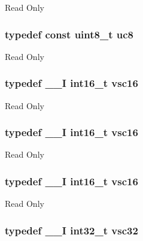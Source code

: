 Read Only \hypertarget{group___exported__types_gac74022c74a461f810e0d4fdc9bfea480}{
\subsubsection[{uc8}]{\setlength{\rightskip}{0pt plus 5cm}typedef const uint8\-\_\-t {\bf uc8}}}\label{group___exported__types_gac74022c74a461f810e0d4fdc9bfea480}
Read Only \hypertarget{group___exported__types_ga369ae0177b957e5afa7c1e62312f97c3}{
\subsubsection[{vsc16}]{\setlength{\rightskip}{0pt plus 5cm}typedef {\bf \-\_\-\-\_\-\-I} int16\-\_\-t {\bf vsc16}}}\label{group___exported__types_ga369ae0177b957e5afa7c1e62312f97c3}
Read Only \hypertarget{group___exported__types_ga369ae0177b957e5afa7c1e62312f97c3}{
\subsubsection[{vsc16}]{\setlength{\rightskip}{0pt plus 5cm}typedef {\bf \-\_\-\-\_\-\-I} int16\-\_\-t {\bf vsc16}}}\label{group___exported__types_ga369ae0177b957e5afa7c1e62312f97c3}
Read Only \hypertarget{group___exported__types_ga369ae0177b957e5afa7c1e62312f97c3}{
\subsubsection[{vsc16}]{\setlength{\rightskip}{0pt plus 5cm}typedef {\bf \-\_\-\-\_\-\-I} int16\-\_\-t {\bf vsc16}}}\label{group___exported__types_ga369ae0177b957e5afa7c1e62312f97c3}
Read Only \hypertarget{group___exported__types_gaec1d22666cf030b79051e5daa372fbc8}{
\subsubsection[{vsc32}]{\setlength{\rightskip}{0pt plus 5cm}typedef {\bf \-\_\-\-\_\-\-I} int32\-\_\-t {\bf vsc32}}}\label{group___exported__types_gaec1d22666cf030b79051e5daa372fbc8}
